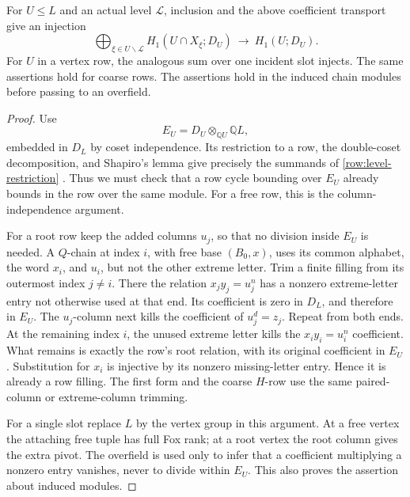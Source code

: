 \begin{proposition}\label{row:restriction}
For \(U\leq L\) and an actual level \(\mathscr L\), inclusion and the
above coefficient transport give an injection
\begin{equation}\label{row:level-restriction}
 \bigoplus_{\xi\in U\backslash\mathscr L}
 H_1(U\cap X_\xi;D_U)\ \longrightarrow\ H_1(U;D_U).
\end{equation}
For \(U\) in a vertex row, the analogous sum over one incident slot
injects. The same assertions hold for coarse rows. The assertions
hold in the induced chain modules before passing to an overfield.
\end{proposition}

\begin{proof}
Use
\[
 E_U=D_U\otimes_{\mathbb QU}\mathbb QL,
\]
embedded in \(D_L\) by coset independence. Its restriction to a row,
the double-coset decomposition, and Shapiro's lemma give precisely
the summands of \eqref{row:level-restriction}
\cite{Brown1982,Serre1980}. Thus we must check that a row cycle
bounding over \(E_U\) already bounds in the row over the same module.
For a free row, this is the column-independence argument.

For a root row keep the added columns \(u_j\), so that no division
inside \(E_U\) is needed. A \(Q\)-chain at index \(i\), with free base
\((B_0,x)\), uses its common alphabet, the word \(x_i\), and \(u_i\),
but not the other extreme letter. Trim a finite filling from its
outermost index \(j\neq i\). There the relation \(x_jy_j=u_j^n\)
has a nonzero extreme-letter entry not otherwise used at that end.
Its coefficient is zero in \(D_L\), and therefore in \(E_U\).
The \(u_j\)-column next kills the coefficient of \(u_j^d=z_j\).
Repeat from both ends. At the remaining index \(i\), the unused
extreme letter kills the \(x_iy_i=u_i^n\) coefficient. What remains
is exactly the row's root relation, with its original coefficient
in \(E_U\). Substitution for \(x_i\) is injective by its nonzero
missing-letter entry. Hence it is already a row filling.
The first form and the coarse \(H\)-row use the same paired-column
or extreme-column trimming.

For a single slot replace \(L\) by the vertex group in this argument.
At a free vertex the attaching free tuple has full Fox rank; at a
root vertex the root column gives the extra pivot. The overfield is
used only to infer that a coefficient multiplying a nonzero entry
vanishes, never to divide within \(E_U\). This also proves the
assertion about induced modules.
\end{proof}

